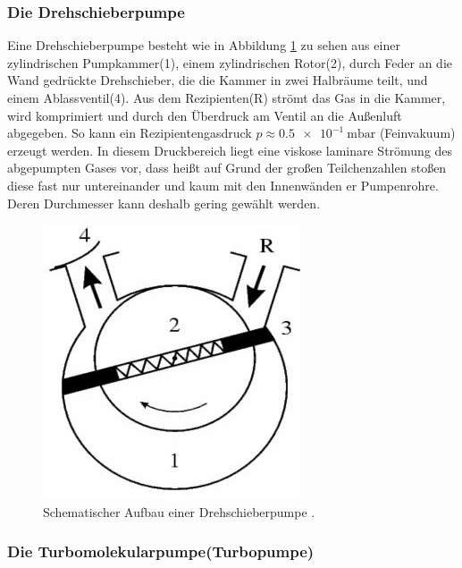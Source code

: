 \subsubsection{Die Drehschieberpumpe}

Eine Drehschieberpumpe besteht wie in Abbildung \ref{fig:DSP} zu sehen aus einer zylindrischen Pumpkammer(1), einem zylindrischen Rotor(2), durch Feder an die Wand gedrückte Drehschieber, die die Kammer in zwei Halbräume teilt, und einem Ablassventil(4). Aus dem Rezipienten(R) strömt das Gas in die Kammer, wird komprimiert und durch den Überdruck am Ventil an die Außenluft abgegeben.\cite{Jena}
So kann ein Rezipientengasdruck $p\approx \SI{0,5e-1}{\milli\bar}$ (Feinvakuum) erzeugt werden.
In diesem Druckbereich liegt eine viskose laminare Strömung des abgepumpten Gases vor, dass heißt auf Grund der großen Teilchenzahlen stoßen diese fast nur untereinander und kaum mit den Innenwänden er Pumpenrohre. Deren Durchmesser kann deshalb gering gewählt werden.
\begin{figure}
\centering
\includegraphics[scale=0.5]{content/images/Drehschieber.jpg}
\caption{Schematischer Aufbau einer Drehschieberpumpe \cite{Jena}.}
\label{fig:DSP}
\end{figure}

\subsubsection{Die Turbomolekularpumpe(Turbopumpe)}

